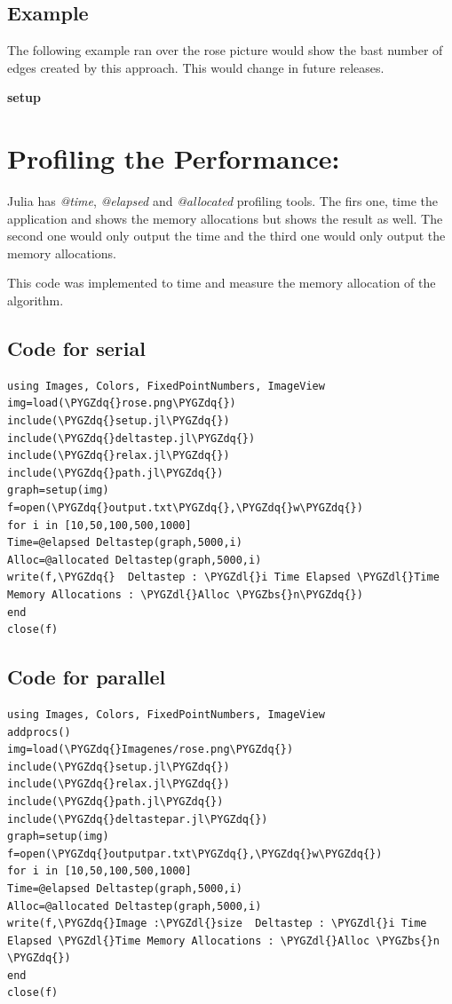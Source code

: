 \documentclass[letterpaper,10pt,english]{sphinxmanual}
\def\PYGZbs{\char`\\}
\def\PYGZdl{\char`\$}
\def\PYGZdq{\char`\"}
\begin{document}
\section{Example}
\label{setup:example}
The following example ran over the rose picture would show the bast number of edges created by this approach. This would change in future releases.

{\color{red}\bfseries{}\textbar{}setup\textbar{}}


\chapter{Profiling the Performance:}
\label{profiling:profiling-the-performance}\label{profiling:profiling}\label{profiling::doc}
Julia has \emph{@time}, \emph{@elapsed} and  \emph{@allocated} profiling tools. The firs one, time the application and shows the memory allocations  but shows the result as well. The second one would only output the time and the third one would only output the memory allocations.

This code was implemented to time and measure the memory allocation of the algorithm.


\section{Code for serial}
\label{profiling:code-for-serial}
\begin{Verbatim}[commandchars=\\\{\}]
using Images, Colors, FixedPointNumbers, ImageView
img=load(\PYGZdq{}rose.png\PYGZdq{})
include(\PYGZdq{}setup.jl\PYGZdq{})
include(\PYGZdq{}deltastep.jl\PYGZdq{})
include(\PYGZdq{}relax.jl\PYGZdq{})
include(\PYGZdq{}path.jl\PYGZdq{})
graph=setup(img)
f=open(\PYGZdq{}output.txt\PYGZdq{},\PYGZdq{}w\PYGZdq{})
for i in [10,50,100,500,1000]
Time=@elapsed Deltastep(graph,5000,i)
Alloc=@allocated Deltastep(graph,5000,i)
write(f,\PYGZdq{}  Deltastep : \PYGZdl{}i Time Elapsed \PYGZdl{}Time Memory Allocations : \PYGZdl{}Alloc \PYGZbs{}n\PYGZdq{})
end
close(f)
\end{Verbatim}


\section{Code for parallel}
\label{profiling:code-for-parallel}
\begin{Verbatim}[commandchars=\\\{\}]
using Images, Colors, FixedPointNumbers, ImageView
addprocs()
img=load(\PYGZdq{}Imagenes/rose.png\PYGZdq{})
include(\PYGZdq{}setup.jl\PYGZdq{})
include(\PYGZdq{}relax.jl\PYGZdq{})
include(\PYGZdq{}path.jl\PYGZdq{})
include(\PYGZdq{}deltastepar.jl\PYGZdq{})
graph=setup(img)
f=open(\PYGZdq{}outputpar.txt\PYGZdq{},\PYGZdq{}w\PYGZdq{})
for i in [10,50,100,500,1000]
Time=@elapsed Deltastep(graph,5000,i)
Alloc=@allocated Deltastep(graph,5000,i)
write(f,\PYGZdq{}Image :\PYGZdl{}size  Deltastep : \PYGZdl{}i Time Elapsed \PYGZdl{}Time Memory Allocations : \PYGZdl{}Alloc \PYGZbs{}n \PYGZdq{})
end
close(f)
\end{Verbatim}
\end{document}
